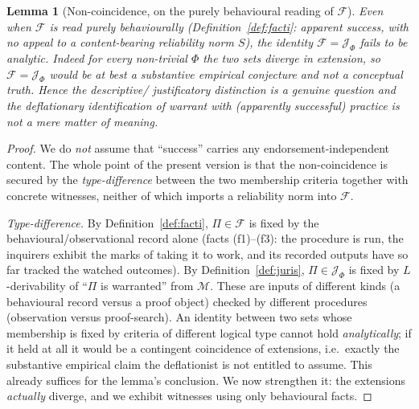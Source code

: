 \documentclass{amsart}
\theoremstyle{definition}
\theoremstyle{plain}
\newtheorem{lemma}{Lemma}
\theoremstyle{remark}
\begin{document}
\begin{lemma}[Non-coincidence, on the purely behavioural reading of
$\mathcal{F}$]\label{lem:noncoincide}
Even when $\mathcal{F}$ is read \emph{purely behaviourally}
(Definition~\ref{def:facti}: apparent success, with \emph{no} appeal to a
content-bearing reliability norm $S$), the identity $\mathcal{F}=\mathcal{J}_\Phi$
fails to be analytic. Indeed for every non-trivial $\Phi$ the two sets diverge
in extension, so $\mathcal{F}=\mathcal{J}_\Phi$ would be at best a substantive
empirical conjecture and not a conceptual truth. Hence the descriptive\slash
justificatory distinction is a genuine question and the deflationary
\emph{identification} of warrant with (apparently successful) practice is not a
mere matter of meaning.
\end{lemma}

\begin{proof}
We do \emph{not} assume that ``success'' carries any endorsement-independent
content. The whole point of the present version is that the non-coincidence is
secured by the \emph{type-difference} between the two membership criteria
together with concrete witnesses, neither of which imports a reliability norm
into $\mathcal{F}$.

\emph{Type-difference.} By Definition~\ref{def:facti}, $\Pi\in\mathcal{F}$ is
fixed by the behavioural/observational record alone (facts (f1)--(f3): the
procedure is run, the inquirers exhibit the marks of taking it to work, and its
recorded outputs have so far tracked the watched outcomes). By
Definition~\ref{def:juris}, $\Pi\in\mathcal{J}_\Phi$ is fixed by
$L$-derivability of ``$\Pi$ is warranted'' from $\mathcal{M}$. These are inputs
of different kinds (a behavioural record versus a proof object) checked by
different procedures (observation versus proof-search). An identity between two
sets whose membership is fixed by criteria of different logical type cannot hold
\emph{analytically}; if it held at all it would be a contingent coincidence of
extensions, i.e.\ exactly the substantive empirical claim the deflationist is
not entitled to assume. This already suffices for the lemma's conclusion. We now
strengthen it: the extensions \emph{actually} diverge, and we exhibit witnesses
using only behavioural facts.


\end{proof}
\end{document}
